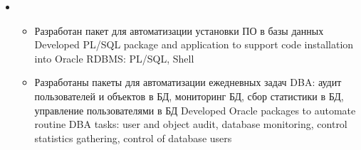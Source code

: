 \documentclass[11pt,a4paper,sans, russian]{moderncv}        %
\begin{document}
{\begin{itemize}
\begin{itemize}
				{Создание rpm- и deb- пакетов для сопровождения изменений}
				{Builded rpm- and deb- packages for business application}
			\item {}
				{Использование системы непрерывного интегрирования Jenkins для сборки пакетов}
				{Implemented a Jenkins continuous integration system for building packages and unit-testing}
			\item {}
				{Разработка и внедрение концепции децентрализованного мониторинга: Oracle dbConsole, MMONIT, Jabber/XMPP}
				{Designed and deployed decentralized monitoring system using Oracle dbConsole, MMONIT, Jabber/XMPP}
		\end{itemize}
	\item {}
		\begin{itemize}
			\item {}
				{Разработан пакет для автоматизации установки ПО в базы данных}
				{Developed PL/SQL package and application to support code installation into Oracle RDBMS: PL/SQL, Shell}
			\item {}
				{Разработаны пакеты для автоматизации ежедневных задач DBA: аудит пользователей и объектов в БД, мониторинг БД, сбор статистики в БД, управление пользователями в БД}
				{Developed Oracle packages to automate routine DBA tasks: user and object audit, database monitoring, control statistics gathering, control of database users}
		\end{itemize}
	\end{itemize}
}
\end{document}
